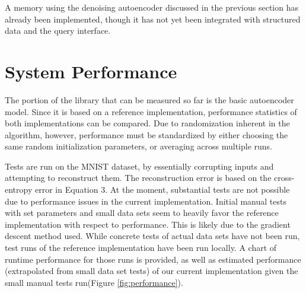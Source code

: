 \documentclass{sig-alternate}
\begin{document}
A memory using the denoising autoencoder discussed in the previous section 
has already been implemented, though it has not yet been integrated with
structured data and the query interface.

\section{System Performance}
\label{sec:sysperformance}

The portion of the library that can be measured so far is the basic autoencoder model. 
Since it is based on a reference implementation, performance statistics of both
implementations can be compared. Due to randomization inherent in the algorithm, however, 
performance must be standardized by either choosing the same random initialization parameters, or 
averaging across multiple runs. 

Tests are run on the MNIST dataset, by essentially corrupting inputs and 
attempting to reconstruct them. 
The reconstruction error is based on the cross-entropy error in Equation 3. 
At the moment, substantial tests are not possible due to performance issues in the current 
implementation. Initial manual tests with set parameters and small data sets seem to heavily favor 
the reference implementation with respect to performance. This is likely due to the gradient descent
method used. While concrete tests of actual data sets have not 
been run, test runs of the reference implementation have been run locally. A chart of runtime
performance for those runs is provided, as well as estimated performance (extrapolated from
small data set tests) of our current 
implementation given the small manual tests run(Figure \ref{fig:performance}). 
\end{document}
